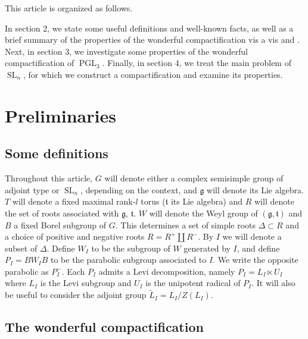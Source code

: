 \documentclass{amsart}
\newcommand{\fr}{\mathfrak}
\DeclareMathOperator{\SL}{SL}
\DeclareMathOperator{\PGL}{PGL}
\theoremstyle{definition}
\theoremstyle{remark}
\numberwithin{equation}{section}
\begin{document}
This article is organized as follows.

In section 2, we state some useful definitions and well-known facts, as well as a  brief summary of the properties of the wonderful compactification vis a vis \cite{FS} and \cite{CSV}.
Next, in section 3, we investigate some properties of the wonderful compactification of $\PGL_3$.
Finally, in section 4, we treat the main problem of $\SL_n$, for which we construct a compactification and examine its properties.

\section{Preliminaries}

\subsection{Some definitions}

Throughout this article, $G$ will denote either a complex semisimple group of adjoint type or $\SL_n$, depending on the context, and $\fr g$ will denote its Lie algebra.
$T$ will denote a fixed maximal rank-$l$ torus ($\fr t$ its Lie algebra) and $R$ will denote the set of roots associated with $\fr g$, $\fr t$. $W$ will denote the Weyl group of $(\fr g,\fr t)$ and $B$ a fixed Borel subgroup of $G$. This determines a set of simple roots $\Delta\subset R$ and a choice of positive and negative roots $R=R^+\coprod R^-$.
By $I$ we will denote a subset of $\Delta$. Define $W_I$ to be the subgroup of $W$ generated by $I$, and define $P_I=BW_IB$ to be the parabolic subgroup associated to $I$. We write the opposite parabolic as $P^-_I$. Each $P_I$ admits a Levi decomposition, namely $P_I=L_I\ltimes U_I$ where $L_I$ is the Levi subgroup and $U_I$ is the unipotent radical of $P_I$. It will also be useful to consider the adjoint group $\tilde L_I=L_I/Z(L_I)$.

\subsection{The wonderful compactification}
\end{document}
